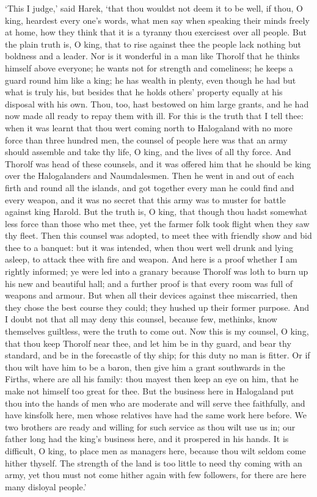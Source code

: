 `This I judge,' said Harek, `that thou wouldst not deem it to be well, if thou, O king, heardest every one's words, what men say when speaking their minds freely at home, how they think that it is a tyranny thou exercisest over all people. But the plain truth is, O king, that to rise against thee the people lack nothing but boldness and a leader. Nor is it wonderful in a man like Thorolf that he thinks himself above everyone; he wants not for strength and comeliness; he keeps a guard round him like a king; he has wealth in plenty, even though he had but what is truly his, but besides that he holds others' property equally at his disposal with his own. Thou, too, hast bestowed on him large grants, and he had now made all ready to repay them with ill. For this is the truth that I tell thee: when it was learnt that thou wert coming north to Halogaland with no more force than three hundred men, the counsel of people here was that an army should assemble and take thy life, O king, and the lives of all thy force. And Thorolf was head of these counsels, and it was offered him that he should be king over the Halogalanders and Naumdalesmen. Then he went in and out of each firth and round all the islands, and got together every man he could find and every weapon, and it was no secret that this army was to muster for battle against king Harold. But the truth is, O king, that though thou hadst somewhat less force than those who met thee, yet the farmer folk took flight when they saw thy fleet. Then this counsel was adopted, to meet thee with friendly show and bid thee to a banquet: but it was intended, when thou wert well drunk and lying asleep, to attack thee with fire and weapon. And here is a proof whether I am rightly informed; ye were led into a granary because Thorolf was loth to burn up his new and beautiful hall; and a further proof is that every room was full of weapons and armour. But when all their devices against thee miscarried, then they chose the best course they could; they hushed up their former purpose. And I doubt not that all may deny this counsel, because few, methinks, know themselves guiltless, were the truth to come out. Now this is my counsel, O king, that thou keep Thorolf near thee, and let him be in thy guard, and bear thy standard, and be in the forecastle of thy ship; for this duty no man is fitter. Or if thou wilt have him to be a baron, then give him a grant southwards in the Firths, where are all his family: thou mayest then keep an eye on him, that he make not himself too great for thee. But the business here in Halogaland put thou into the hands of men who are moderate and will serve thee faithfully, and have kinsfolk here, men whose relatives have had the same work here before. We two brothers are ready and willing for such service as thou wilt use us in; our father long had the king's business here, and it prospered in his hands. It is difficult, O king, to place men as managers here, because thou wilt seldom come hither thyself. The strength of the land is too little to need thy coming with an army, yet thou must not come hither again with few followers, for there are here many disloyal people.'

